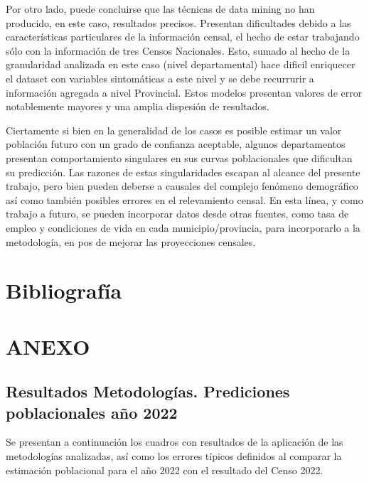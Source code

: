 \documentclass{article}
\theoremstyle{mytheoremstyle}
\theoremstyle{mytheoremstyle}
\theoremstyle{myproblemstyle}
\begin{document}
Por otro lado, puede concluirse que las técnicas de data mining no han producido, en este caso, resultados precisos. Presentan dificultades debido a las características particulares de la información censal, el hecho de estar trabajando sólo con la información de tres Censos Nacionales. Esto, sumado al hecho de la granularidad analizada en este caso (nivel departamental) hace dificil enriquecer el dataset con variables sintomáticas a este nivel y se debe recurrurir a información agregada
a nivel Provincial. Estos modelos presentan valores de error notablemente mayores y una amplia dispesión de resultados.\newline

Ciertamente si bien en la generalidad de los casos es posible estimar un valor población futuro con un grado de confianza aceptable, algunos departamentos presentan comportamiento singulares en sus curvas poblacionales que dificultan 
su predicción. Las razones de estas singularidades escapan al alcance del presente trabajo, pero bien pueden deberse a causales del complejo fenómeno demográfico así como también posibles errores en el relevamiento censal.
En esta línea, y como trabajo a futuro, se pueden incorporar datos desde otras fuentes, como tasa de empleo y condiciones de vida en cada municipio/provincia, para incorporarlo a la metodología, en pos de mejorar las proyecciones censales.



\section{Bibliografía}
\printbibliography%

\section{ANEXO}
\subsection{Resultados Metodologías. Prediciones poblacionales año 2022}\label{ResultadosMetodlogias}
Se presentan a continuación los cuadros con resultados de la aplicación de las metodologías analizadas, así como los 
errores típicos definidos al comparar la estimación poblacional para el año 2022 con el resultado del Censo 2022.
\end{document}
